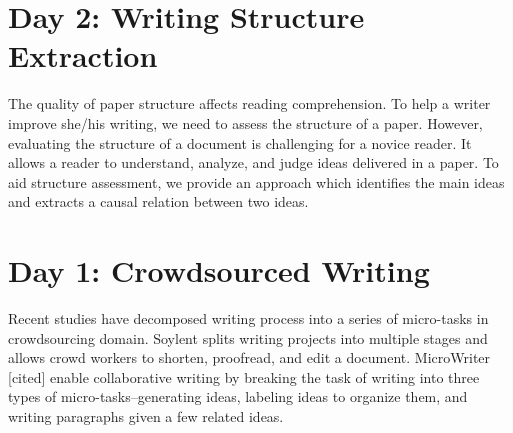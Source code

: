 \documentclass[a4paper]{article}
\begin{document}
\section{Day 2: Writing Structure Extraction}
The quality of paper structure affects reading comprehension. To help a writer improve she/his writing, we need to assess the structure of a paper. However, evaluating the structure of a document is challenging for a novice reader. It allows a reader to understand, analyze, and judge ideas delivered in a paper. To aid structure assessment, we provide an approach which identifies the main ideas and extracts a causal relation between two ideas.

\section{Day 1: Crowdsourced Writing}
Recent studies have decomposed writing process into a series of micro-tasks in crowdsourcing domain. Soylent \cite{Bernstein:UIST10} splits writing projects into multiple stages and allows crowd workers to shorten, proofread, and edit a document. MicroWriter [cited] enable collaborative writing by breaking the task of writing into three types of micro-tasks--generating ideas, labeling ideas to organize them, and writing paragraphs given a few related ideas.

 

\end{document}
